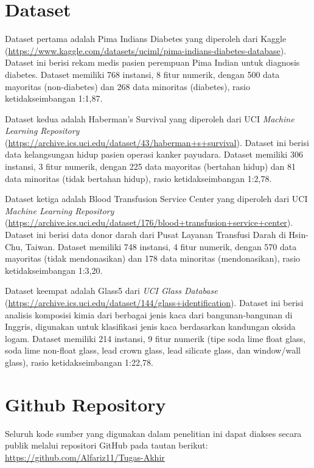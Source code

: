 
\section{Dataset}

Dataset pertama adalah Pima Indians Diabetes yang diperoleh dari Kaggle (\url{https://www.kaggle.com/datasets/uciml/pima-indians-diabetes-database}). Dataset ini berisi rekam medis pasien perempuan Pima Indian untuk diagnosis diabetes. Dataset memiliki 768 instansi, 8 fitur numerik, dengan 500 data mayoritas (non-diabetes) dan 268 data minoritas (diabetes), rasio ketidakseimbangan 1:1,87.

Dataset kedua adalah Haberman's Survival yang diperoleh dari UCI \textit{Machine Learning Repository} (\url{https://archive.ics.uci.edu/dataset/43/haberman+s+survival}). Dataset ini berisi data kelangsungan hidup pasien operasi kanker payudara. Dataset memiliki 306 instansi, 3 fitur numerik, dengan 225 data mayoritas (bertahan hidup) dan 81 data minoritas (tidak bertahan hidup), rasio ketidakseimbangan 1:2,78.

Dataset ketiga adalah Blood Transfusion Service Center yang diperoleh dari UCI \textit{Machine Learning Repository} (\url{https://archive.ics.uci.edu/dataset/176/blood+transfusion+service+center}). Dataset ini berisi data donor darah dari Pusat Layanan Transfusi Darah di Hsin-Chu, Taiwan. Dataset memiliki 748 instansi, 4 fitur numerik, dengan 570 data mayoritas (tidak mendonasikan) dan 178 data minoritas (mendonasikan), rasio ketidakseimbangan 1:3,20.

Dataset keempat adalah Glass5 dari \textit{UCI Glass Database} (\url{https://archive.ics.uci.edu/dataset/144/glass+identification}). Dataset ini berisi analisis komposisi kimia dari berbagai jenis kaca dari bangunan-bangunan di Inggris, digunakan untuk klasifikasi jenis kaca berdasarkan kandungan oksida logam. Dataset memiliki 214 instansi, 9 fitur numerik (tipe soda lime float glass, soda lime non-float glass, lead crown glass, lead silicate glass, dan window/wall glass), rasio ketidakseimbangan 1:22,78.

\section{Github Repository}

Seluruh kode sumber yang digunakan dalam penelitian ini dapat diakses secara publik melalui repositori GitHub pada tautan berikut:
\url{https://github.com/Alfariz11/Tugas-Akhir}
